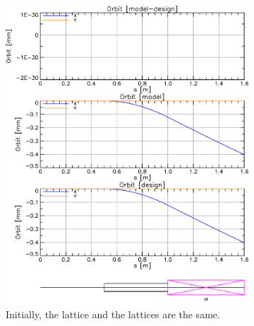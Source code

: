 \documentclass{hitec}
\begin{document}
\begin{figure}[tb]
  \centering
  \begin{subfigure}[b]{0.47\textwidth}
    \includegraphics[width=\textwidth]{model-equal-design.pdf}
    \caption{Initially, the  lattice and the  lattices are the same.}
    \label{f:model.eq.design}
  \end{subfigure}
  \hfil
  \begin{subfigure}[b]{0.47\textwidth}

\end{subfigure}
\end{figure}
\end{document}
